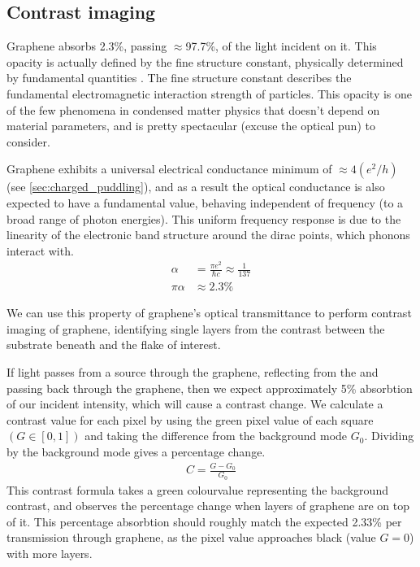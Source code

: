 \documentclass[../Matt_Gebert_Honours_Thesis.tex]{subfiles}
\begin{document}
\subsection{Contrast imaging}
Graphene absorbs 2.3\%, passing $\approx$97.7\%, of the light incident on it. This opacity is actually defined by the fine structure constant, physically determined by fundamental quantities \cite{nair_fine_2008}. The fine structure constant describes the fundamental electromagnetic interaction strength of particles. This opacity is one of the few phenomena in condensed matter physics that doesn't depend on material parameters, and is pretty spectacular (excuse the optical pun) to consider.

Graphene exhibits a universal electrical conductance minimum of $\approx 4 (e^2/h)$ (see \cref{sec:charged_puddling}), and as a result \cite{kuzmenko_universal_2008} the optical conductance is also expected to have a fundamental value, behaving independent of frequency (to a broad range of photon energies). This uniform frequency response is due to the linearity of the electronic band structure around the dirac points, which phonons interact with.
\begin{align}
	\alpha&= \frac{\pi e^2}{\hbar c} \approx \frac{1}{137}\\
	\pi \alpha &\approx 2.3\%
\end{align}

We can use this property of graphene's optical transmittance to perform contrast imaging of graphene, identifying single layers from the contrast between the substrate beneath and the flake of interest.  \cite{li_rapid_2013,wang_thickness_2012,ni_graphene_2007} 

If light passes from a source through the graphene, reflecting from the \silicondioxide{} and passing back through the graphene, then we expect approximately 5\% absorbtion of our incident intensity, which will cause a contrast change.
We calculate a contrast value for each pixel by using the green pixel value of each square $\left(G\in[0,1]\right)$ and taking the difference from the background mode $G_0$. \cite{ni_graphene_2007,wang_thickness_2012} Dividing by the background mode gives a percentage change.
\begin{align}
C = \frac{G-G_0}{G_0}\label{eqn:contrast}
\end{align}
This contrast formula takes a green colourvalue representing the background contrast, and observes the percentage change when layers of graphene are on top of it. This percentage absorbtion should roughly match the expected 2.33\% per transmission through graphene, as the pixel value approaches black (value $G=0$) with more layers.
\end{document}
